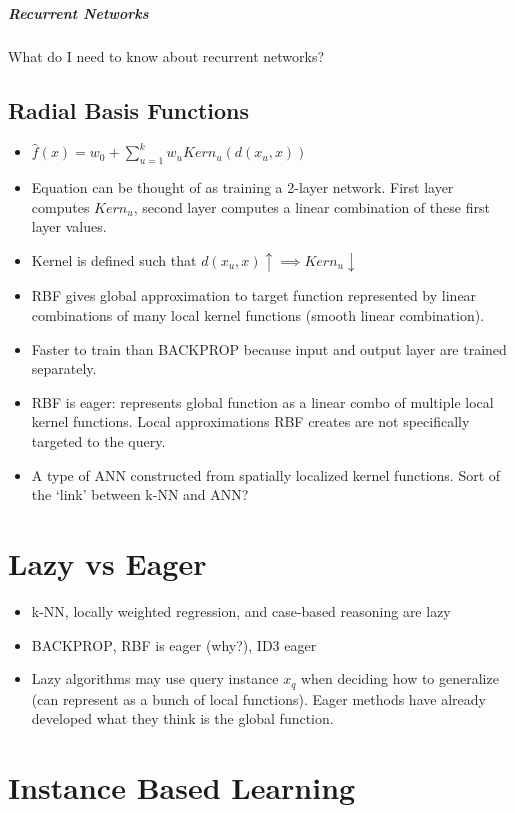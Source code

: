 \documentclass[titlepage,11pt]{article}
\begin{document}
\subparagraph{Recurrent Networks}
What do I need to know about recurrent networks?

\subsection{Radial Basis Functions}
\begin{itemize}
\item $\hat{f}(x) = w_0+ \sum_{u=1}^k{w_uKern_u(d(x_u, x))}$
\item Equation can be thought of as training a 2-layer network. First layer computes $Kern_u$, second layer computes a linear combination of these first layer values.
\item Kernel is defined such that $d(x_u, x) \uparrow \implies Kern_u \downarrow$
\item RBF gives global approximation to target function represented by linear combinations of many local kernel functions (smooth linear combination).
\item Faster to train than \textsc{BACKPROP} because input and output layer are trained separately.
\item RBF is eager: represents global function as a linear combo of multiple local kernel functions. Local approximations RBF creates are not specifically targeted to the query.
\item A type of ANN constructed from spatially localized kernel functions. Sort of the `link' between k-NN and ANN?
\end{itemize}


\section{Lazy vs Eager}
\begin{itemize}
\item k-NN, locally weighted regression, and case-based reasoning are lazy
\item \textsc{BACKPROP}, RBF is eager (why?), ID3 eager
\item Lazy algorithms may use query instance $x_q$ when deciding how to generalize (can represent as a bunch of local functions). Eager methods have already developed what they think is the global function.
\end{itemize}
\section{Instance Based Learning}
\end{document}
